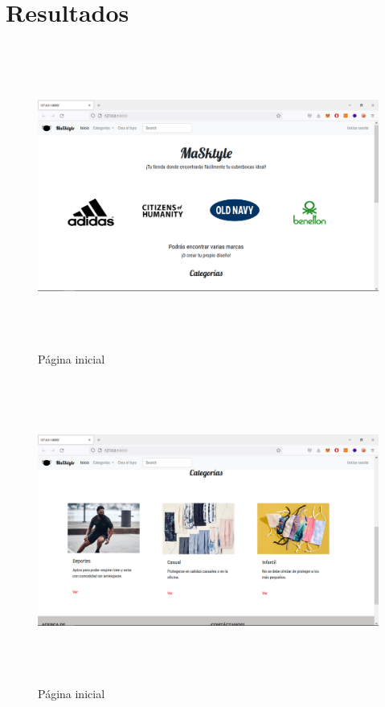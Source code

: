 \documentclass[letterpaper,12pt]{article}
\begin{document}
\section{Resultados}
\begin{figure}[H]
	\includegraphics[width=18cm, height=10cm]{1}
	\centering
	\caption{Página inicial}
\end{figure}
\begin{figure}[H]
	\includegraphics[width=18cm, height=10cm]{2}
	\centering
	\caption{Página inicial}
\end{figure}
\end{document}
